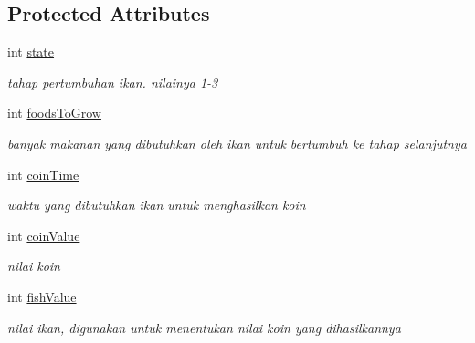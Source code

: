 \subsection*{Protected Attributes}
\begin{DoxyCompactItemize}
\item 
\mbox{\label{classFish_ab77f075818cbdd5e350379418a35172d}} 
int \hyperlink{classFish_ab77f075818cbdd5e350379418a35172d}{state}
\begin{DoxyCompactList}\small\item\em tahap pertumbuhan ikan. nilainya 1-\/3 \end{DoxyCompactList}\item 
\mbox{\label{classFish_a2a3e810d6b92aea2c29c69635c32a6ce}} 
int \hyperlink{classFish_a2a3e810d6b92aea2c29c69635c32a6ce}{foods\+To\+Grow}
\begin{DoxyCompactList}\small\item\em banyak makanan yang dibutuhkan oleh ikan untuk bertumbuh ke tahap selanjutnya \end{DoxyCompactList}\item 
\mbox{\label{classFish_ae9fdbf6d08fefff329bac0ee2e58ea2d}} 
int \hyperlink{classFish_ae9fdbf6d08fefff329bac0ee2e58ea2d}{coin\+Time}
\begin{DoxyCompactList}\small\item\em waktu yang dibutuhkan ikan untuk menghasilkan koin \end{DoxyCompactList}\item 
\mbox{\label{classFish_a749b3925d3efc3a0b6278efccfe3dbea}} 
int \hyperlink{classFish_a749b3925d3efc3a0b6278efccfe3dbea}{coin\+Value}
\begin{DoxyCompactList}\small\item\em nilai koin \end{DoxyCompactList}\item 
\mbox{\label{classFish_acdd9042f3010004eb28bbd33fd215835}} 
int \hyperlink{classFish_acdd9042f3010004eb28bbd33fd215835}{fish\+Value}
\begin{DoxyCompactList}\small\item\em nilai ikan, digunakan untuk menentukan nilai koin yang dihasilkannya \end{DoxyCompactList}\item 

\end{DoxyCompactItemize}
